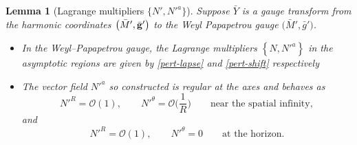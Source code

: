 \documentclass[11pt]{article}
\numberwithin{equation}{section}
\renewcommand{\gg}{{\bf g}}
\numberwithin{equation}{section}
\newtheorem{Lemma}[Theorem]{Lemma}
\begin{document}
 \begin{Lemma}[Lagrange multipliers $\{ N', N'^a \}$]
 	Suppose $\bar{Y}$ is a gauge transform from the harmonic coordinates $\bigl(\bar{M}', \bar{\gg}'\bigr)$ to the Weyl Papapetrou gauge $\bigl(\bar{M}', \bar{g}'\bigr)$.
 	\begin{itemize}\itemsep=0pt
 \item In the Weyl--Papapetrou gauge, the Lagrange multipliers $\left\{ N, N'^a\right\}$ in the asymptotic regions are given by \eqref{pert-lapse} and \eqref{pert-shift} respectively

\item The vector field $N'^a$ so constructed is regular at the axes and behaves as
\[
N'^R = \mathcal{O}(1), \qquad N'^\theta = \mathcal{O}\biggl(\frac{1}{R}\biggr) \qquad \text{near the spatial infinity},
\]
and
\[
N'^R = \mathcal{O}(1), \qquad N'^\theta =0 \qquad \text{at the horizon}.
\]
\end{itemize}
\end{Lemma}
\end{document}
